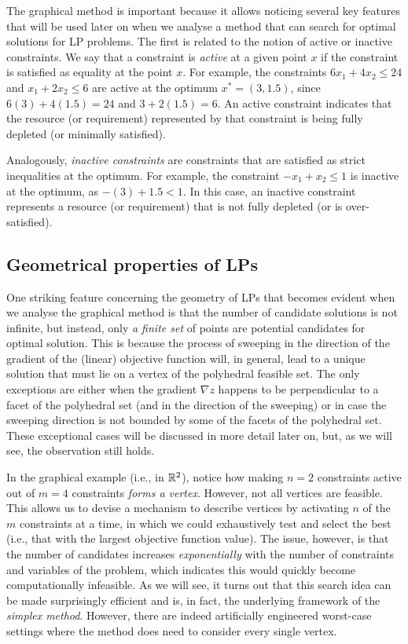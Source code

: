 The graphical method is important because it allows noticing several key features that will be used later on when we analyse a method that can search for optimal solutions for LP problems. The first is related to the notion of active or inactive constraints. We say that a constraint is \emph{active} at a given point $x$ if the constraint is satisfied as equality at the point $x$. For example, the constraints $6x_1 + 4x_2 \leq 24$ and $x_1 + 2x_2 \leq 6$ are active at the optimum $x^* = (3, 1.5)$, since $6(3) + 4(1.5) = 24$ and $3 + 2(1.5) = 6$. An active constraint indicates that the resource (or requirement) represented by that constraint is being fully depleted (or minimally satisfied). 

Analogously, \emph{inactive constraints} are constraints that are satisfied as strict inequalities at the optimum. For example, the constraint $-x_1 + x_2 \leq 1$ is inactive at the optimum, as $-(3) + 1.5 < 1$. In this case, an inactive constraint represents a resource (or requirement) that is not fully depleted (or is over-satisfied).


\subsection{Geometrical properties of LPs}

One striking feature concerning the geometry of LPs that becomes evident when we analyse the graphical method is that the number of candidate solutions is not infinite, but instead, only \emph{a finite set} of points are potential candidates for optimal solution. This is because the process of sweeping in the direction of the gradient of the (linear) objective function will, in general, lead to a unique solution that must lie on a vertex of the polyhedral feasible set. The only exceptions are either when the gradient $\nabla z$ happens to be perpendicular to a facet of the polyhedral set (and in the direction of the sweeping) or in case the sweeping direction is not bounded by some of the facets of the polyhedral set. These exceptional cases will be discussed in more detail later on, but, as we will see, the observation still holds.

In the graphical example (i.e., in $\mathbb{R}^2$), notice how making $n = 2$ constraints active out of $m = 4$ constraints \emph{forms a vertex}. However, not all vertices are feasible. This allows us to devise a mechanism to describe vertices by activating $n$ of the $m$ constraints at a time, in which we could exhaustively test and select the best (i.e., that with the largest objective function value). The issue, however, is that the number of candidates increases \emph{exponentially} with the number of constraints and variables of the problem, which indicates this would quickly become computationally infeasible. As we will see, it turns out that this search idea can be made surprisingly efficient and is, in fact, the underlying framework of the \emph{simplex method}. However, there are indeed artificially engineered worst-case settings where the method does need to consider every single vertex.

